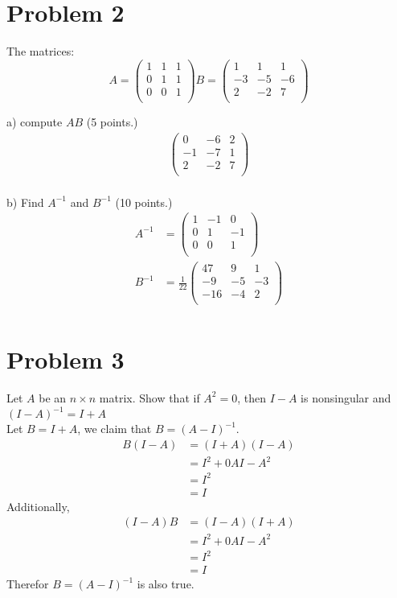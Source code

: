 \documentclass[]{article}
\begin{document}
\newpage
\section{Problem 2}
The matrices:
$$
A =
\begin{pmatrix}
	1 & 1 & 1 \\
	0 & 1 & 1 \\
	0 & 0 & 1 \\
\end{pmatrix}
B =
\begin{pmatrix}
	1 & 1 & 1 \\
	-3&-5 &-6 \\
	2 &-2 & 7 \\
\end{pmatrix}
$$

a) compute $AB$ (5 points.) 
\begin{align*}
	\begin{pmatrix}
		0  &-6 & 2 \\
		-1 &-7 & 1 \\
		2  &-2 & 7 \\
	\end{pmatrix} \\
\end{align*}

b) Find $A^{−1}$ and $B^{−1}$ (10 points.) \\
\begin{align*}
A^{-1} &=
	\begin{pmatrix}
		1 &-1 & 0 \\
		0 & 1 &-1 \\
		0 & 0 & 1 \\
	\end{pmatrix} \\
B^{-1} &= \frac{1}{22}
	\begin{pmatrix}
		47 & 9 & 1 \\
		-9 &-5 &-3 \\
		-16&-4 & 2 \\
	\end{pmatrix} \\
\end{align*}

\newpage
\section{Problem 3}
Let $A$ be an $n×n$ matrix. 
Show that if $A^2 = 0$, then $I −A$ is nonsingular and $(I −A)^{−1} = I + A$ \\
\bigskip
Let $B = I + A$, we claim that $B = (A-I)^{-1}$. \\
\begin{align*}
	B(I-A) &= (I+A)(I-A) 	\\
		&= I^2 + 0AI - A^2	\\
		&= I^2				\\
		&= I
\end{align*}
Additionally, \\
\begin{align*}
	(I-A)B &= (I-A)(I+A) 	\\
		&= I^2 + 0AI - A^2	\\
		&= I^2 				\\
		&= I
\end{align*}
Therefor $B = (A-I)^{-1}$ is also true.
\end{document}
